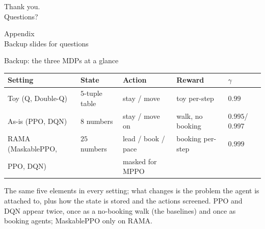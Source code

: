 \documentclass[aspectratio=169, 11pt, t]{beamer}
\newcommand{\emp}[1]{#1}
\newcommand{\body}{\large}
\begin{document}
{\begin{frame}[c]
\centering
{\Huge Thank you.}\\[0.9em]
{\large Questions?}
\end{frame}}

\appendix
\renewcommand{\body}{\small}  %

{\begin{frame}[c]
\centering
{\Huge Appendix}\\[0.6em]
{\large Backup slides for questions}
\end{frame}}

\begin{frame}{Backup: the three MDPs at a glance}
\vfill
\centering\small
\renewcommand{\arraystretch}{2.4}
\begin{tabular}{lllll}
\toprule
Setting & State & Action & Reward & $\gamma$\\
\midrule
Toy (Q, Double-Q) & $5$-tuple table & stay / move & toy per-step & $0.99$\\
As-is (PPO, DQN) & $8$ numbers & stay / move on & walk, no booking & $0.995$/$0.997$\\
RAMA (MaskablePPO, & $25$ numbers & lead / book / pace & booking per-step & $0.999$\\
\quad PPO, DQN) & & masked for MPPO & & \\
\bottomrule
\end{tabular}
\vfill
\raggedright\normalsize
\emp{The same five elements in every setting; what changes is the problem the agent is attached to,
plus how the state is stored and the actions screened. PPO and DQN appear twice, once as a no-booking
walk (the baselines) and once as booking agents; MaskablePPO only on RAMA.}
\vfill
\end{frame}
\end{document}
